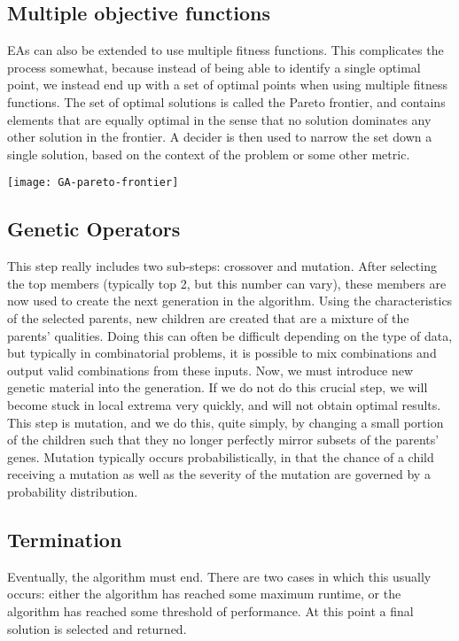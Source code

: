 \subsection{Multiple objective functions}
EAs can also be extended to use multiple fitness functions. This complicates the process somewhat, because instead of being able to identify a single optimal point, we instead end up with a set of optimal points when using multiple fitness functions. The set of optimal solutions is called the Pareto frontier, and contains elements that are equally optimal in the sense that no solution dominates any other solution in the frontier. A decider is then used to narrow the set down a single solution, based on the context of the problem or some other metric.


\begin{marginfigure}
\texttt{[image: GA-pareto-frontier]}
\end{marginfigure}


\subsection{Genetic Operators}
This step really includes two sub-steps: crossover and mutation. After selecting the top members (typically top 2, but this number can vary), these members are now used to create the next generation in the algorithm. Using the characteristics of the selected parents, new children are created that are a mixture of the parents’ qualities. Doing this can often be difficult depending on the type of data, but typically in combinatorial problems, it is possible to mix combinations and output valid combinations from these inputs. Now, we must introduce new genetic material into the generation. If we do not do this crucial step, we will become stuck in local extrema very quickly, and will not obtain optimal results. This step is mutation, and we do this, quite simply, by changing a small portion of the children such that they no longer perfectly mirror subsets of the parents’ genes. Mutation typically occurs probabilistically, in that the chance of a child receiving a mutation as well as the severity of the mutation are governed by a probability distribution.

\subsection{Termination}
Eventually, the algorithm must end. There are two cases in which this usually occurs: either the algorithm has reached some maximum runtime, or the algorithm has reached some threshold of performance. At this point a final solution is selected and returned.


